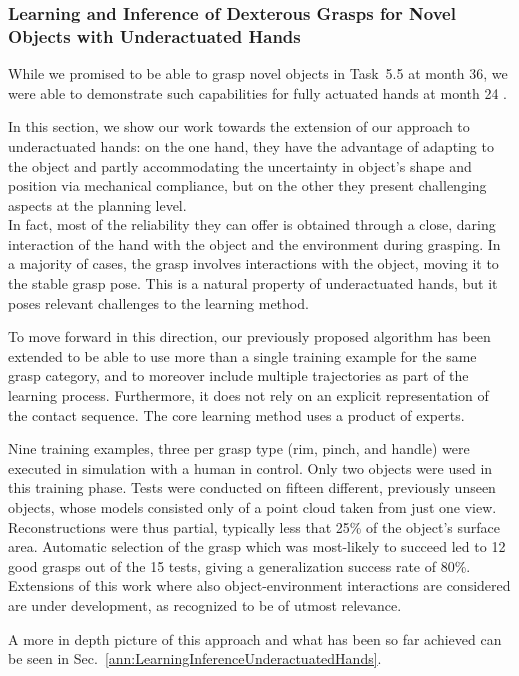 
\subsubsection{Learning and Inference of Dexterous Grasps for Novel Objects with Underactuated Hands}
\label{sec:LearningInferenceUnderactuatedHands}

While we promised to be able to grasp novel objects in Task~5.5 at month 36, we were able to demonstrate such capabilities for fully actuated hands at month 24 \cite{kopicki2015oneshot}.

In this section, we show our work towards the extension of our approach to underactuated hands: on the one hand, they have the advantage of adapting to the object and partly accommodating the uncertainty in object's shape and position via mechanical compliance, but on the other they present challenging aspects at the planning level.\\
In fact, most of the reliability they can offer is obtained through a close, daring interaction of the hand with the object and the environment during grasping.
In a majority of cases, the grasp involves interactions with the object, moving it to the stable grasp pose.
This is a natural property of underactuated hands, but it poses relevant challenges to the learning method.

To move forward in this direction, our previously proposed algorithm has been extended to be able to use more than a single training example for the same grasp category, and to moreover include multiple trajectories as part of the learning process.
Furthermore, it does not rely on an explicit representation of the contact sequence.
The core learning method uses a product of experts.

Nine training examples, three per grasp type (rim, pinch, and handle) were executed in simulation with a human in control.
Only two objects were used in this training phase. Tests were conducted on fifteen different, previously unseen objects, whose models consisted only of a point cloud taken from just one view.
Reconstructions were thus partial, typically less that 25\% of the object's surface area.
Automatic selection of the grasp which was most-likely to succeed led to 12 good grasps out of the 15 tests, giving a generalization success rate of 80\%.\\
Extensions of this work where also object-environment interactions are considered are under development, as recognized to be of utmost relevance.

A more in depth picture of this approach and what has been so far achieved can be seen in Sec.~\ref{ann:LearningInferenceUnderactuatedHands}.
